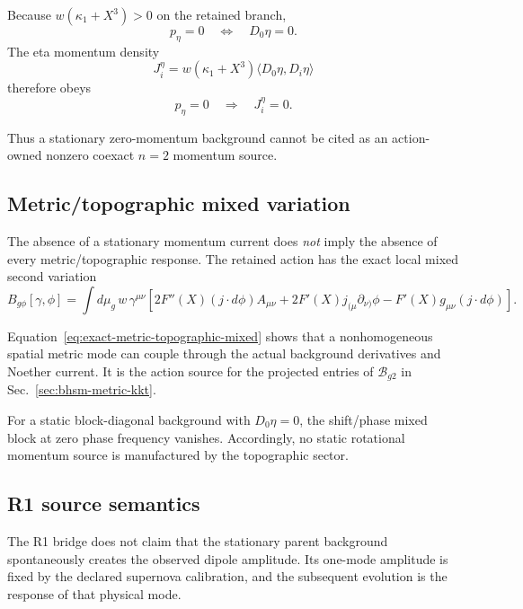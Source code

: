 Because $w(\kappa_1+X^3)>0$ on the retained branch,
\begin{equation}
p_\eta=0
\quad\Longleftrightarrow\quad
D_0\eta=0.
\end{equation}
The eta momentum density
\begin{equation}
J_i^\eta
=
w(\kappa_1+X^3)
\langle D_0\eta,D_i\eta\rangle
\end{equation}
therefore obeys
\begin{equation}
\boxed{
p_\eta=0
\quad\Longrightarrow\quad
J_i^\eta=0.
}
\label{eq:stationary-current-zero}
\end{equation}

Thus a stationary zero-momentum background cannot be cited as an action-owned
nonzero coexact $n=2$ momentum source.

\subsection{Metric/topographic mixed variation}

The absence of a stationary momentum current does \emph{not} imply the absence
of every metric/topographic response.  The retained action has the exact
local mixed second variation
\begin{equation}
B_{g\phi}[\gamma,\phi]
=
\int d\mu_g\,w\,\gamma^{\mu\nu}
\left[
2F''(X)(j\!\cdot\!d\phi)A_{\mu\nu}
+
2F'(X)j_{(\mu}\partial_{\nu)}\phi
-
F'(X)g_{\mu\nu}(j\!\cdot\!d\phi)
\right].
\label{eq:exact-metric-topographic-mixed}
\end{equation}

Equation~\eqref{eq:exact-metric-topographic-mixed} shows that a
nonhomogeneous spatial metric mode can couple through the actual background
derivatives and Noether current.  It is the action source for the projected
entries of $\mathcal B_{g2}$ in
Sec.~\ref{sec:bhsm-metric-kkt}.

For a static block-diagonal background with
$D_0\eta=0$, the shift/phase mixed block at zero phase frequency vanishes.
Accordingly, no static rotational momentum source is manufactured by the
topographic sector.

\subsection{R1 source semantics}

The R1 bridge does not claim that the stationary parent background
spontaneously creates the observed dipole amplitude.  Its one-mode amplitude
is fixed by the declared supernova calibration, and the subsequent evolution
is the response of that physical mode.

